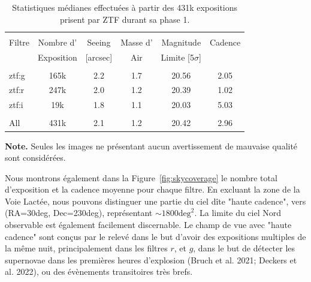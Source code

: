 \documentclass[../main/main.tex]{subfiles}
\begin{document}
\begin{table}[ht]
  \scriptsize
  \centerfloat
  \setlength\tabcolsep{14pt}
  \renewcommand{\arraystretch}{1.2}
  \begin{threeparttable}

    \caption{Statistiques médianes effectuées à partir des 431k
      expositions prisent par ZTF durant sa phase 1.}
    \label{tab:summary_systematics}
    \begin{tabular}{l c c c c c}
      \hline\\[-0.5em]
      \hline\\[-0.5em]
      Filtre  & Nombre d' & Seeing & Masse d' & Magnitude & Cadence\\[0.15em]
              & Exposition & [arcsec] &  Air & Limite [5$\sigma$] &  \\[0.15em]
      \hline\\[-0.5em]
      ztf:g   & 165k & 2.2 & 1.7 & 20.56 & 2.05\\[0.30em]
      ztf:r   & 247k & 2.0 & 1.2 & 20.39 & 1.02\\[0.30em]
      ztf:i   & 19k & 1.8 & 1.1 & 20.03 & 5.03\\[0.30em]
      \hline\\[-0.5em]
      All & 431k & 2.1 & 1.2 & 20.42 & 2.96\\[0.30em]
    \end{tabular}
    \begin{tablenotes}[flushleft]
    \item \textbf{Note.} Seules les images ne présentant aucun
      avertissement de mauvaise
      qualité sont considérées. 
    \end{tablenotes}
  \end{threeparttable}
\end{table}


Nous montrons également dans la Figure~\ref{fig:skycoverage} le nombre
total d'exposition et la cadence moyenne pour chaque filtre. En excluant
la zone de la Voie Lactée, nous pouvons distinguer une partie du ciel
dîte "haute cadence", vers (RA=30deg, Dec=230deg), représentant $\sim1800\text{deg}^{2}$. La limite du ciel
Nord observable est également facilement discernable.
Le champ de vue avec "haute cadence" sont conçus par le relevé dans le
but d'avoir des expositions multiples de la même nuit, principalement
dans les filtres $r$, et $g$, dans le but de détecter les supernovae
dans les premières
heures d'explosion (Bruch et al.
2021; Deckers et al. 2022), ou des évènements transitoires très brefs.
\end{document}
